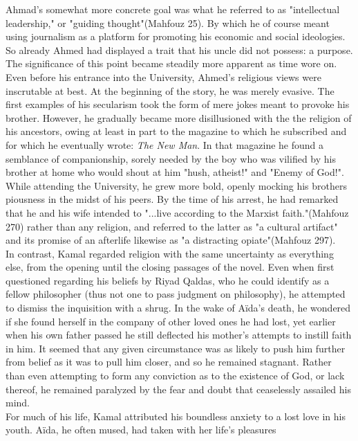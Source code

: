 \documentclass[a4paper,12pt]{article}
\providecommand{\mhfz}[1]{(Mahfouz #1)}
\begin{document}
Ahmad's somewhat more concrete goal was what he referred to as "intellectual
leadership," or "guiding thought"\mhfz{25}. By which he of course meant using
journalism as a platform for promoting his economic and social ideologies. So
already Ahmed had displayed a trait that his uncle did not possess: a purpose.
The significance of this point became steadily more apparent as time wore on.\\
\indent Even before his entrance into the University, Ahmed's religious views
were inscrutable at best. At the beginning of the story, he was merely evasive.
The first examples of his secularism took the form of mere jokes meant to
provoke his brother. However, he gradually became more disillusioned with the
the religion of his ancestors, owing at least in part to the magazine to which
he subscribed and for which he eventually wrote: \textit{The New Man}. In that
magazine he found a semblance of companionship, sorely needed by the boy who was
vilified by his brother at home who would shout at him "hush, atheist!" and
"Enemy of God!". While attending the University, he grew more bold, openly
mocking his brothers piousness in the midst of his peers. By the time of his
arrest, he had remarked that he and his wife intended to "...live according to
the Marxist faith."\mhfz{270} rather than any religion, and referred to the
latter as "a cultural artifact" and its promise of an afterlife likewise as
"a distracting opiate"\mhfz{297}.
\\
\indent In contrast, Kamal regarded religion with the same uncertainty as
everything
else, from the opening until the closing passages of the novel. Even when first
questioned regarding his beliefs by Riyad Qaldas, who he could identify
as a fellow philosopher (thus not one to pass judgment on philosophy), he attempted to dismiss the inquisition with a shrug.
In the wake of A\"ida's death, he wondered if she found herself in the company
of other loved ones he had lost, yet earlier when his own father passed he still
deflected his mother's attempts to instill faith in him. It seemed that any
given circumstance was as likely to push him further from belief as it was to
pull him closer, and so he remained stagnant.
Rather than even attempting to form any conviction as to the existence of God,
or lack thereof, he remained paralyzed by the fear and doubt that ceaselessly
assailed his mind.\\
\indent For much of his life, Kamal attributed his boundless anxiety to a lost
love in his youth. A\"ida, he often mused, had taken with her life's pleasures
\end{document}
